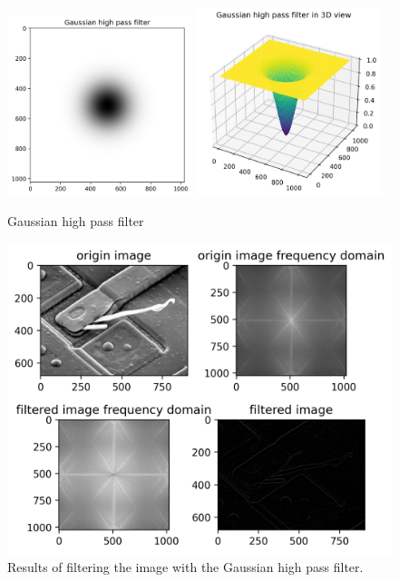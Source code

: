 \begin{figure}[htbp]
    \centering
	\includegraphics[width=0.48\textwidth]{../images/p1/p1b_Gaussian.png}
	\includegraphics[width=0.48\textwidth]{../images/p1/p1b_Gaussian_3D.png}
    \caption{Gaussian high pass filter}
    \label{fig:p1b_Gaussian}
\end{figure}

\begin{figure}[htbp]
    \centering
	\includegraphics[width=\textwidth]{../images/p1/p1b_filter.png}
    \caption{Results of filtering the image with the Gaussian high pass filter.}
    \label{fig:p1b_result}
\end{figure}

\newpage